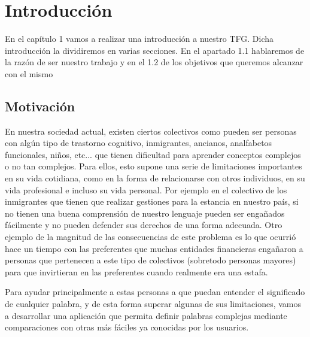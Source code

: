 \chapter{Introducción}
\label{cap:introduccion}


\begin{resumen}
	En el capítulo 1 vamos a realizar una introducción a nuestro TFG. Dicha introducción la dividiremos en varias secciones. En el apartado 1.1 hablaremos de la razón de ser nuestro trabajo y en el 1.2 de los objetivos que queremos alcanzar con el mismo
	
	
\end{resumen}


\section{Motivación}
\label{cap:sec:motivacion}
En nuestra sociedad actual, existen ciertos colectivos como pueden ser personas con algún tipo de trastorno cognitivo, inmigrantes, ancianos, analfabetos funcionales, niños, etc... que tienen dificultad para aprender conceptos complejos o no tan complejos. Para ellos, esto supone una serie de limitaciones importantes en su vida cotidiana, como en la forma de relacionarse con otros individuos, en su vida profesional e incluso su vida personal. Por ejemplo en el colectivo de los inmigrantes que tienen que realizar gestiones para la estancia en nuestro país, si no tienen una buena comprensión de nuestro lenguaje pueden ser engañados fácilmente y no pueden defender sus derechos de una forma adecuada. Otro ejemplo de la magnitud de las consecuencias de este problema es lo que ocurrió hace un tiempo con las preferentes que muchas entidades financieras engañaron a personas que pertenecen a este tipo de colectivos (sobretodo personas mayores) para que invirtieran en las preferentes cuando realmente era una estafa.  

Para ayudar principalmente a estas personas a que puedan entender el significado de cualquier palabra, y de esta forma superar algunas de sus limitaciones, vamos a desarrollar una aplicación que permita definir palabras complejas mediante comparaciones con otras más fáciles ya conocidas por los usuarios. 

